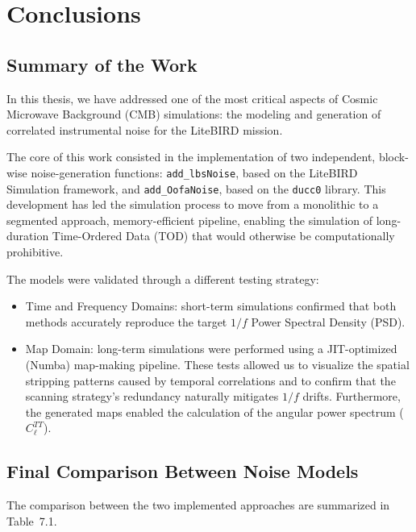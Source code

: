 \chapter{Conclusions}

\section{Summary of the Work}
In this thesis, we have addressed one of the most critical aspects of Cosmic Microwave Background (CMB) simulations: the modeling and generation of correlated instrumental noise for the LiteBIRD mission. 

The core of this work consisted in the implementation of two independent, block-wise noise-generation functions: \texttt{add\_lbsNoise}, based on the LiteBIRD Simulation framework, and \texttt{add\_OofaNoise}, based on the \texttt{ducc0} library. This development has led the simulation process to move from a monolithic to a segmented approach, memory-efficient pipeline, enabling the simulation of long-duration Time-Ordered Data (TOD) that would otherwise be computationally prohibitive.

The models were validated through a different testing strategy:
\begin{itemize}
    \item Time and Frequency Domains: short-term simulations confirmed that both methods accurately reproduce the target $1/f$ Power Spectral Density (PSD).
    \item Map Domain: long-term simulations were performed using a JIT-optimized (Numba) map-making pipeline. These tests allowed us to visualize the spatial stripping patterns caused by temporal correlations and to confirm that the scanning strategy's redundancy naturally mitigates $1/f$ drifts. Furthermore, the generated maps enabled the calculation of the angular power spectrum ($C_\ell^{TT}$).
\end{itemize}




\section{Final Comparison Between Noise Models}
The comparison between the two implemented approaches are summarized in Table~7.1.

